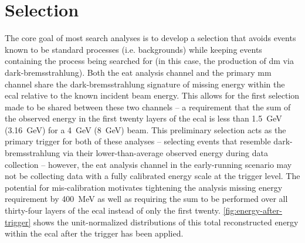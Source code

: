 \section{Selection}
The core goal of most search analyses is to develop a selection that avoids events known to be
standard processes (i.e. backgrounds) while keeping events containing the process being searched
for (in this case, the production of \ac{dm} via dark-bremsstrahlung).
Both the \ac{eat} analysis channel and the primary \ac{mm} channel share the dark-bremsstrahlung
signature of missing energy within the \ac{ecal} relative to the known incident beam energy.
This allows for the first selection made to be shared between these two channels -- 
a requirement that the sum of the observed energy in the first twenty layers of the \ac{ecal}
is less than \qty{1.5}{\GeV} (\qty{3.16}{\GeV}) for a \qty{4}{\GeV} (\qty{8}{\GeV}) beam.
This preliminary selection acts as the primary trigger for both of these analyses --
selecting events that resemble dark-bremsstrahlung via their lower-than-average
observed energy during data collection -- however, the \ac{eat} analysis channel in the early-running
scenario may not be collecting data with a fully calibrated energy scale at the trigger level.
The potential for mis-calibration motivates tightening the analysis missing energy requirement
by \qty{400}{\mega\electronvolt} as well as requiring the sum to be performed over all thirty-four
layers of the \ac{ecal} instead of only the first twenty.
\cref{fig:energy-after-trigger} shows the unit-normalized distributions of this total reconstructed
energy within the \ac{ecal} after the trigger has been applied.

